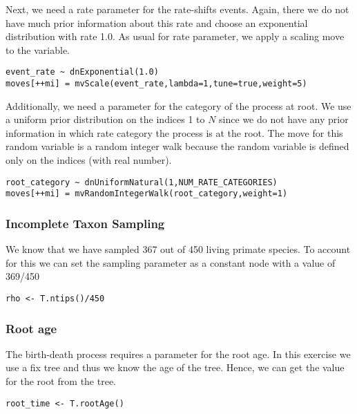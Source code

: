Next, we need a rate parameter for the rate-shifts events.
Again, there we do not have much prior information about this rate and choose an exponential distribution with rate 1.0.
As usual for rate parameter, we apply a scaling move to the  variable.
{\tt \begin{snugshade*}
\begin{lstlisting}
event_rate ~ dnExponential(1.0)
moves[++mi] = mvScale(event_rate,lambda=1,tune=true,weight=5)
\end{lstlisting}
\end{snugshade*}}

Additionally, we need a parameter for the category of the process at root.
We use a uniform prior distribution on the indices 1 to $N$ since we do not have any prior information in which rate category the process is at the root.
The move for this random variable is a random integer walk because the random variable is defined only on the indices (\CF with real number).
{\tt \begin{snugshade*}
\begin{lstlisting}
root_category ~ dnUniformNatural(1,NUM_RATE_CATEGORIES)
moves[++mi] = mvRandomIntegerWalk(root_category,weight=1)
\end{lstlisting}
\end{snugshade*}}



\subsubsection{Incomplete Taxon Sampling}

We know that we have sampled 367 out of 450 living primate species. 
To account for this we can set the sampling parameter as a constant node with a value of 369/450
{\tt \begin{snugshade*}
\begin{lstlisting}
rho <- T.ntips()/450
\end{lstlisting}
\end{snugshade*}}


\subsubsection{Root age}

The birth-death process requires a parameter for the root age.
In this exercise we use a fix tree and thus we know the age of the tree.
Hence, we can get the value for the root from the \citet{Springer2012} tree.
{\tt \begin{snugshade*}
\begin{lstlisting}
root_time <- T.rootAge()
\end{lstlisting}
\end{snugshade*}}

